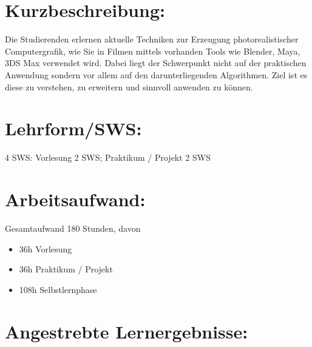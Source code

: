 \section*{Kurzbeschreibung:}\label{kurzbeschreibung-8}

Die Studierenden erlernen aktuelle Techniken zur Erzeugung
photorealistischer Computergrafik, wie Sie in Filmen mittels vorhanden
Tools wie Blender, Maya, 3DS Max verwendet wird. Dabei liegt der
Schwerpunkt nicht auf der praktischen Anwendung sondern vor allem auf
den darunterliegenden Algorithmen. Ziel ist es diese zu verstehen, zu
erweitern und sinnvoll anwenden zu können.

\section*{Lehrform/SWS:}\label{lehrformsws-16}

4 SWS: Vorlesung 2 SWS; Praktikum / Projekt 2 SWS

\section*{Arbeitsaufwand:}\label{arbeitsaufwand-17}

Gesamtaufwand 180 Stunden, davon

\begin{itemize}
\tightlist
\item
  36h Vorlesung
\item
  36h Praktikum / Projekt
\item
  108h Selbstlernphase
\end{itemize}

\section*{Angestrebte
Lernergebnisse:}\label{angestrebte-lernergebnisse-16}


